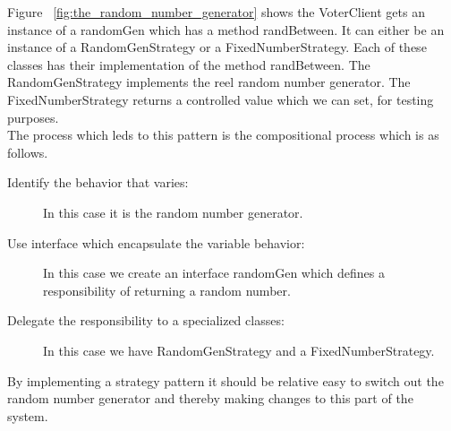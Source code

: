 \noindent
Figure ~\ref{fig:the_random_number_generator}  shows the VoterClient gets an instance of a randomGen which has a method randBetween. It can either be an instance of a RandomGenStrategy or a FixedNumberStrategy. Each of these classes has their implementation of the method randBetween. The RandomGenStrategy implements the reel random number generator. The FixedNumberStrategy returns a controlled value which we can set, for testing purposes.\\

\noindent
The process which leds to this pattern is the compositional process which is as follows.


\begin{description}
    \item[Identify the behavior that varies:] In this case it is the random number generator.  

    \item[Use interface which encapsulate the variable behavior:]  In this case we create an interface randomGen which defines a  responsibility of returning a random number.     
    
    \item[Delegate the responsibility to a specialized classes:] In this case we have RandomGenStrategy and a FixedNumberStrategy.
\end{description}

\noindent
By implementing a strategy pattern it should be relative easy to switch out the random number generator and thereby making changes to this part of the system.